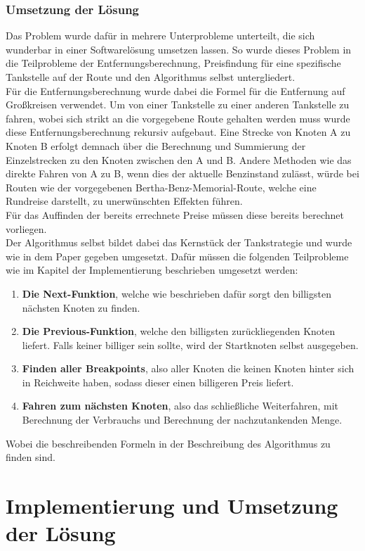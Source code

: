 \documentclass[11pt]{article}
\begin{document}
\subsubsection{Umsetzung der Lösung}
	Das Problem wurde dafür in mehrere Unterprobleme unterteilt, die sich wunderbar in einer Softwarelösung umsetzen lassen. So wurde dieses Problem in die Teilprobleme der Entfernungsberechnung, Preisfindung für eine spezifische Tankstelle auf der Route und den Algorithmus selbst untergliedert. \\
	Für die Entfernungsberechnung wurde dabei die Formel für die Entfernung auf Großkreisen verwendet. Um von einer Tankstelle zu einer anderen Tankstelle zu fahren, wobei sich strikt an die vorgegebene Route gehalten werden muss wurde diese Entfernungsberechnung rekursiv aufgebaut. Eine Strecke von Knoten A zu Knoten B erfolgt demnach über die Berechnung und Summierung der Einzelstrecken zu den Knoten zwischen den A und B. Andere Methoden wie das direkte Fahren von A zu B, wenn dies der aktuelle Benzinstand zulässt, würde bei Routen wie der vorgegebenen Bertha-Benz-Memorial-Route, welche eine Rundreise darstellt, zu unerwünschten Effekten führen. \\
	Für das Auffinden der bereits errechnete Preise müssen diese bereits berechnet vorliegen. \\
	Der Algorithmus selbst bildet dabei das Kernstück der Tankstrategie und wurde wie in dem Paper gegeben umgesetzt. Dafür müssen die folgenden Teilprobleme wie im Kapitel der Implementierung beschrieben umgesetzt werden:
	\begin{enumerate}
		\item \textbf{Die Next-Funktion}, welche wie beschrieben dafür sorgt den billigsten nächsten Knoten zu finden.
		\item \textbf{Die Previous-Funktion}, welche den billigsten zurückliegenden Knoten liefert. Falls keiner billiger sein sollte, wird der Startknoten selbst ausgegeben.
		\item \textbf{Finden aller Breakpoints}, also aller Knoten die keinen Knoten hinter sich in Reichweite haben, sodass dieser einen billigeren Preis liefert.
		\item \textbf{Fahren zum nächsten Knoten}, also das schließliche Weiterfahren, mit Berechnung der Verbrauchs und Berechnung der nachzutankenden Menge.
	\end{enumerate}
	Wobei die beschreibenden Formeln in der Beschreibung des Algorithmus zu finden sind.
\section{Implementierung und Umsetzung der Lösung}
	
\end{document}
